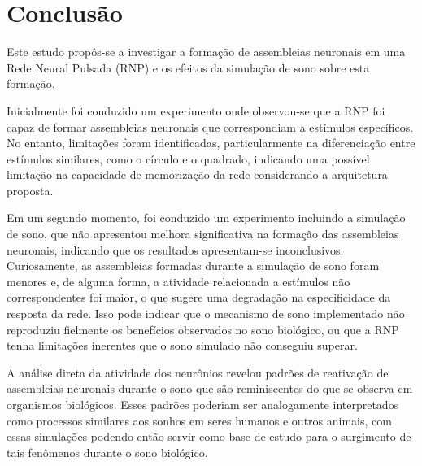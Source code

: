 \chapter{Conclusão}\label{cap_conclusao}

Este estudo propôs-se a investigar a formação de assembleias neuronais em uma Rede Neural Pulsada (RNP) e os efeitos da simulação
de sono sobre esta formação.

Inicialmente foi conduzido um experimento onde observou-se que a RNP foi capaz de formar assembleias neuronais que correspondiam a
estímulos específicos. No entanto, limitações foram identificadas, particularmente na diferenciação entre estímulos similares,
como o círculo e o quadrado, indicando uma possível limitação na capacidade de memorização da rede considerando a arquitetura
proposta.

Em um segundo momento, foi conduzido um experimento incluindo a simulação de sono, que não apresentou melhora significativa na
formação das assembleias neuronais, indicando que os resultados apresentam-se inconclusivos. Curiosamente, as assembleias formadas
durante a simulação de sono foram menores e, de alguma forma, a atividade relacionada a estímulos não correspondentes foi maior, o
que sugere uma degradação na especificidade da resposta da rede. Isso pode indicar que o mecanismo de sono implementado não
reproduziu fielmente os benefícios observados no sono biológico, ou que a RNP tenha limitações inerentes que o sono simulado não
conseguiu superar.

A análise direta da atividade dos neurônios revelou padrões de reativação de assembleias neuronais durante o sono que são
reminiscentes do que se observa em organismos biológicos. Esses padrões poderiam ser analogamente interpretados como processos
similares aos sonhos em seres humanos e outros animais, com essas simulações podendo então servir como base de estudo para o
surgimento de tais fenômenos durante o sono biológico.

